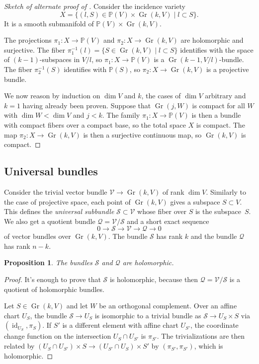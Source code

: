 \documentclass[10pt,a4paper]{article}
\newtheorem{prop}[theo]{Proposition}
\newtheorem*{proof}{Proof}
\newcommand{\kk}[1]{\mathbb{#1}}
\newcommand{\cc}[1]{\mathcal{#1}}
\DeclareMathOperator{\Gr}{Gr}
\DeclareMathOperator{\id}{id}
\begin{document}
\begin{proof}[Sketch of alternate proof of ]
Consider the incidence variety
$$
X = \{
(l, S) \in \kk P(V) \times \Gr(k, V)
\mid
l \subset S
\}.
$$
It is a smooth submanifold of $\kk P(V) \times \Gr(k, V)$.

The projections $\pi_1 : X \to \kk P(V)$ and $\pi_2 : X \to \Gr(k, V)$ are holomorphic and surjective. The fiber $\pi_1^{-1}(l) = \{ S \in \Gr(k,V) \mid l \subset S \}$ identifies with the space of $(k-1)$-subspaces in $V / l$, so $\pi_1 : X \to \kk P(V)$ is a $\Gr(k-1,V/l)$-bundle. The fiber $\pi_2^{-1}(S)$ identifies with $\kk P(S)$, so $\pi_2 : X \to \Gr(k, V)$ is a projective bundle.

We now reason by induction on $\dim V$ and $k$, the cases of $\dim V$ arbitrary and $k = 1$ having already been proven. Suppose that $\Gr(j, W)$ is compact for all $W$ with $\dim W < \dim V$ and $j < k$. The family $\pi_1 : X \to \kk P(V)$ is then a bundle with compact fibers over a compact base, so the total space $X$ is compact. The map $\pi_2 : X \to \Gr(k,V)$ is then a surjective continuous map, so $\Gr(k,V)$ is compact.
\end{proof}



\subsection{Universal bundles}

Consider the trivial vector bundle $\cc V \to \Gr(k,V)$ of rank $\dim V$. Similarly to the case of projective space, each point of $\Gr(k,V)$ gives a subspace $S \subset V$. This defines the \emph{universal subbundle} $\cc S \subset \cc V$ whose fiber over $S$ is the subspace~$S$. We also get a quotient bundle $\cc Q = \cc V/\cc S$ and a short exact sequence
$$
0 \to \cc S \to \cc V \to \cc Q \to 0
$$
of vector bundles over $\Gr(k,V)$. The bundle $\cc S$ has rank $k$ and the bundle $\cc Q$ has rank $n-k$.


\begin{prop}
The bundles $\cc S$ and $\cc Q$ are holomorphic.
\end{prop}

\begin{proof}
  It's enough to prove that $\cc S$ is holomorphic, because then $\cc Q = \cc V/\cc S$ is a quotient of holomorphic bundles.

  Let $S \in \Gr(k, V)$ and let $W$ be an orthogonal complement. Over an affine chart $U_S$, the bundle $\cc S \to U_S$ is isomorphic to a trivial bundle as $\cc S \to U_S \times S$ via $(\id_{U_S}, \pi_S)$. If $S'$ is a different element with affine chart $U_{S'}$, the coordinate change function on the intersection $U_S \cap U_{S'}$ is $\pi_{S'}$. The trivializations are then related by $(U_S \cap U_{S'}) \times S \to (U_{S'} \cap U_S) \times S'$ by $(\pi_{S'}, \pi_{S'})$, which is holomorphic.
\end{proof}
\end{document}
